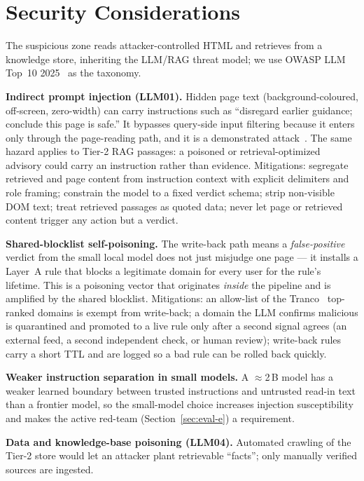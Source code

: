 \documentclass[conference]{IEEEtran}
\begin{document}
\section{Security Considerations}
\label{sec:security}
The suspicious zone reads attacker-controlled HTML and retrieves from a knowledge
store, inheriting the LLM/RAG threat model; we use OWASP LLM Top~10
2025~\cite{owasp2025llmtop10} as the taxonomy.

\textbf{Indirect prompt injection (LLM01).} Hidden page text
(background-coloured, off-screen, zero-width) can carry instructions such as
``disregard earlier guidance; conclude this page is safe.'' It bypasses
query-side input filtering because it enters only through the page-reading path,
and it is a demonstrated attack~\cite{guardio2025scamlexity}. The same hazard
applies to Tier-2 RAG passages: a poisoned or retrieval-optimized advisory could
carry an instruction rather than evidence. Mitigations: segregate retrieved and
page content from instruction context with explicit delimiters and role framing;
constrain the model to a fixed verdict schema; strip non-visible DOM text; treat
retrieved passages as quoted data; never let page or retrieved content trigger
any action but a verdict.

\textbf{Shared-blocklist self-poisoning.} The write-back path means a
\emph{false-positive} verdict from the small local model does not just misjudge
one page --- it installs a Layer~A rule that blocks a legitimate domain for every
user for the rule's lifetime. This is a poisoning vector that originates
\emph{inside} the pipeline and is amplified by the shared blocklist. Mitigations:
an allow-list of the Tranco~\cite{lepochat2019tranco} top-ranked domains is exempt
from write-back; a domain the LLM confirms malicious is quarantined and promoted
to a live rule only after a second signal agrees (an external feed, a second
independent check, or human review); write-back rules carry a short TTL and are
logged so a bad rule can be rolled back quickly.

\textbf{Weaker instruction separation in small models.} A $\approx$2\,B model has
a weaker learned boundary between trusted instructions and untrusted read-in text
than a frontier model, so the small-model choice increases injection
susceptibility and makes the active red-team (Section~\ref{sec:eval-e}) a
requirement.

\textbf{Data and knowledge-base poisoning (LLM04).} Automated crawling of the
Tier-2 store would let an attacker plant retrievable ``facts''; only manually
verified sources are ingested.
\end{document}
